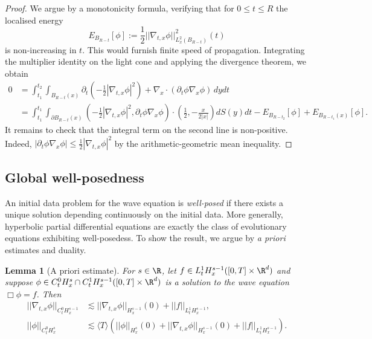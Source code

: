 \documentclass[reqno]{amsart}
\newtheorem{lemma}[theorem]{Lemma}
\theoremstyle{definition}
\theoremstyle{remark}
\newcounter{problem}[section]	\declaretheorem[style=thmrecbox,name=Problem, numberlike=problem]{statement}
\begin{document}
\begin{proof}
	We argue by a monotonicity formula, verifying that for $0 \leq t \leq R$ the localised energy
		\[ E_{B_{R - t}}[\phi] := \frac12 || \nabla_{t, x} \phi||_{L^2_x (B_{R - t})}^2 (t) \]
	is 	non-increasing in $t$. This would furnish finite speed of propagation. Integrating the multiplier identity on the light cone and applying the divergence theorem, we obtain 
		\begin{align*}
			 0 
			 	&= \int_{t_1}^{t_2} \int_{B_{R - t} (x)}\partial_t \left( -\frac12 |\nabla_{t, x} \phi|^2 \right) + \nabla_x \cdot (\partial_t \phi \nabla_x \phi) \, dy dt \\
			 	&= \int_{t_1}^{t_1}\int_{\partial B_{R - t} (x)} \left( - \frac12 |\nabla_{t, x} \phi|^2, \partial_t \phi \nabla_x \phi \right) \cdot \left(\frac12, -\frac{x}{2|x|} \right) dS(y) dt - E_{B_{R - t_2}}[\phi] + E_{B_{R - t_1} (x)} [\phi] .
		\end{align*} 	
	It remains to check that the integral term on the second line is non-positive. Indeed, $|\partial_t \phi \nabla_x \phi| \leq \tfrac12 |\nabla_{t, x} \phi|^2$ by the arithmetic-geometric mean inequality.
\end{proof}

\subsection{Global well-posedness}

An initial data problem for the wave equation is \textit{well-posed} if there exists a unique solution depending continuously on the initial data. More generally, hyperbolic partial differential equations are exactly the class of evolutionary equations exhibiting well-posedess. To show the result, we argue by \textit{a priori} estimates and duality. 

\begin{lemma}[A priori estimate]
	For $s \in \R$, let $f \in L^1_t H^{s - 1}_x ([0, T] \times \R^d)$ and suppose $\phi \in C_t^0 H^s_x \cap C^1_t H^{s - 1}_x ([0, T] \times \R^d)$ is a solution to the wave equation $\Box \phi = f$. Then 
		\begin{align*}
			||\nabla_{t, x} \phi||_{C^0_t H^{s - 1}_x} 
				&\lesssim ||\nabla_{t, x} \phi ||_{H^{s - 1}_x} (0) + ||f||_{L^1_t H^{s - 1}_x}, \\
			||\phi||_{C^0_t H^{s}_x}
				&\lesssim \langle T \rangle \left(|| \phi||_{H^{s}_x} (0) + ||\nabla_{t, x} \phi||_{H^{s - 1}_x} (0) + ||f||_{L^1_t H^{s - 1}_x}	\right).
		\end{align*}\label{cor:apriori}
\end{lemma}
\end{document}
